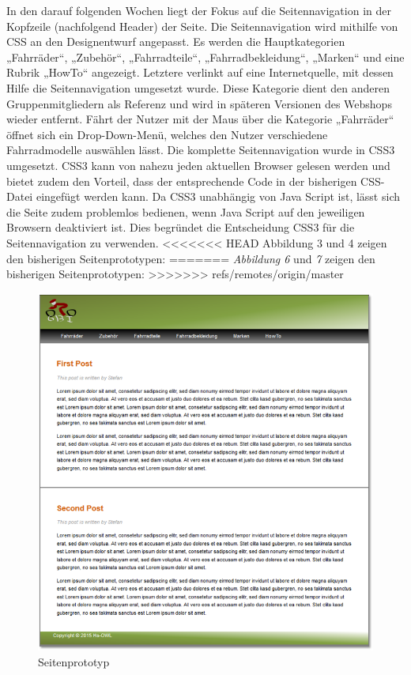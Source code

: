In den darauf folgenden Wochen liegt der Fokus auf die Seitennavigation in der Kopfzeile (nachfolgend Header) der Seite. Die Seitennavigation wird mithilfe von CSS an den Designentwurf angepasst. Es werden die Hauptkategorien „Fahrräder“, „Zubehör“, „Fahrradteile“, „Fahrradbekleidung“, „Marken“ und eine Rubrik „HowTo“ angezeigt. Letztere verlinkt auf eine Internetquelle, mit dessen Hilfe die Seitennavigation umgesetzt wurde. Diese Kategorie dient den anderen Gruppenmitgliedern als Referenz und wird in späteren Versionen des Webshops wieder entfernt. Fährt der Nutzer mit der Maus über die Kategorie „Fahrräder“ öffnet sich ein Drop-Down-Menü, welches den Nutzer verschiedene Fahrradmodelle auswählen lässt. Die komplette Seitennavigation wurde in CSS3 umgesetzt. CSS3 kann von nahezu jeden aktuellen Browser gelesen werden und bietet zudem den Vorteil, dass der entsprechende Code in der bisherigen CSS-Datei eingefügt werden kann. Da CSS3 unabhängig von Java Script ist, lässt sich die Seite zudem problemlos bedienen, wenn Java Script auf den jeweiligen Browsern deaktiviert ist. Dies begründet die Entscheidung CSS3 für die Seitennavigation zu verwenden.
<<<<<<< HEAD
Abbildung 3 und 4 zeigen den bisherigen Seitenprototypen:
=======
\textit{Abbildung 6} und \textit{7} zeigen den bisherigen Seitenprototypen:
>>>>>>> refs/remotes/origin/master



\begin{figure}[H]
\begin{center}
\includegraphics[width=150mm]{Bilder/Abbildung3-Seitenprototyp.png}
\end{center}
\caption{Seitenprototyp}
\end{figure}



